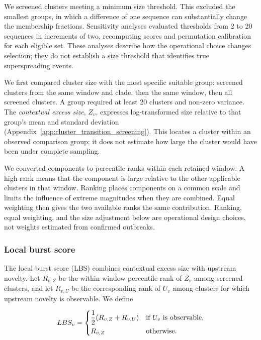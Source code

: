We screened clusters meeting a minimum size threshold. This excluded the smallest groups, in which a difference of one sequence can substantially change the membership fractions. Sensitivity analyses evaluated thresholds from 2 to 20 sequences in increments of two, recomputing scores and permutation calibration for each eligible set. These analyses describe how the operational choice changes selection; they do not establish a size threshold that identifies true superspreading events.

We first compared cluster size with the most specific suitable group: screened clusters from the same window and clade, then the same window, then all screened clusters. A group required at least 20 clusters and non-zero variance. The \emph{contextual excess size}, $Z_v$, expresses log-transformed size relative to that group's mean and standard deviation (Appendix~\ref{app:cluster_transition_screening}). This locates a cluster within an observed comparison group; it does not estimate how large the cluster would have been under complete sampling.

We converted components to percentile ranks within each retained window. A high rank means that the component is large relative to the other applicable clusters in that window. Ranking places components on a common scale and limits the influence of extreme magnitudes when they are combined. Equal weighting then gives the two available ranks the same contribution. Ranking, equal weighting, and the size adjustment below are operational design choices, not weights estimated from confirmed outbreaks.

\subsubsection*{Local burst score}

The local burst score (LBS) combines contextual excess size with upstream novelty. Let $R_{v,Z}$ be the within-window percentile rank of $Z_v$ among screened clusters, and let $R_{v,U}$ be the corresponding rank of $U_v$ among clusters for which upstream novelty is observable. We define

\nopagebreak[4]
\[
    LBS_v =
    \begin{dcases}
        \frac{1}{2}(R_{v,Z} + R_{v,U}) & \text{if } U_v \text{ is observable}, \\
        R_{v,Z} & \text{otherwise}.
    \end{dcases}
\]

